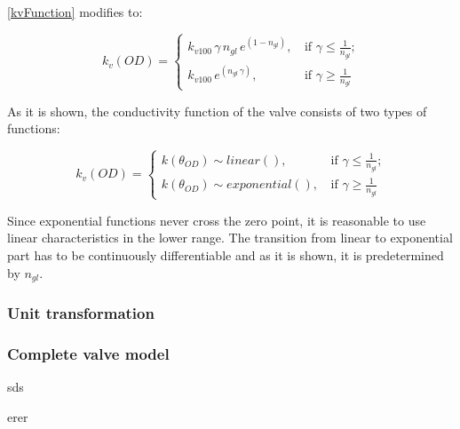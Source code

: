 \eqref{kvFunction} modifies to: 

\begin{equation}
 k_v(OD) =
		\left\{
		\begin{array}{ll}
		
		k_{v100} \, \gamma \, n_{gl} \, e^{(1-n_{gl})} \text{,} & \mbox{ if } 	\gamma \leq \frac{1}					{n_{gl}} \text{;}
\\
		k_{v100} \, e^{(n_{gl} \,\gamma)} \text{,} & \mbox{ if } \gamma \geq \frac{1}{n_{gl}}

		\end{array}
		\right.
\end{equation}	

As it is shown, the conductivity function of the valve consists of two types of functions: 

\begin{equation}
 k_v(OD) =
		\left\{
		\begin{array}{ll}
		
		k(\theta_{OD}) \sim linear() \text{,} & \mbox{ if } 	\gamma \leq \frac{1}					{n_{gl}} \text{;}
\\
		k(\theta_{OD}) \sim exponential() \text{,} & \mbox{ if } \gamma \geq \frac{1}{n_{gl}}

		\end{array}
		\right.
\end{equation}	

Since exponential functions never cross the zero point, it is reasonable to use linear characteristics in the lower range. The transition from linear to exponential part has to be continuously differentiable and as it is shown, it is predetermined by $n_{gl}$. \citep{Kallesoe2009} \cite{keller}

\subsubsection{Unit transformation}
\label{unittransform}

\subsubsection{Complete valve model}
\label{unittransform}


\cite{kvvalve}
 
sds \cite{valvedatasheet}

erer \cite{keller}
 
 
 